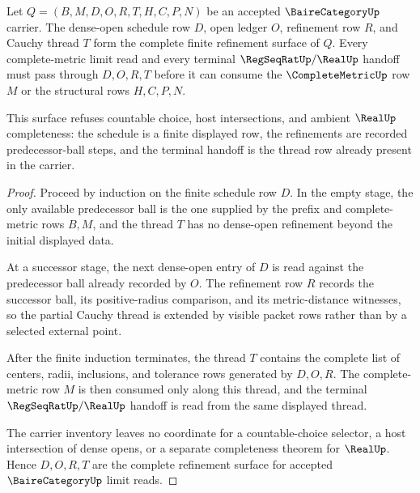 \begin{theorem}
\label{thm:bairecategory-refinement-schedule-obligation}
Let $Q=(B,M,D,O,R,T,H,C,P,N)$ be an accepted $\BaireCategoryUp$ carrier. The dense-open schedule row $D$, open ledger $O$, refinement row $R$, and Cauchy thread $T$ form the complete finite refinement surface of $Q$. Every complete-metric limit read and every terminal $\RegSeqRatUp/\RealUp$ handoff must pass through $D,O,R,T$ before it can consume the $\CompleteMetricUp$ row $M$ or the structural rows $H,C,P,N$.

This surface refuses countable choice, host intersections, and ambient $\RealUp$ completeness: the schedule is a finite displayed row, the refinements are recorded predecessor-ball steps, and the terminal handoff is the thread row already present in the carrier.
\end{theorem}
\begin{proof}
Proceed by induction on the finite schedule row $D$. In the empty stage, the only available predecessor ball is the one supplied by the prefix and complete-metric rows $B,M$, and the thread $T$ has no dense-open refinement beyond the initial displayed data.

At a successor stage, the next dense-open entry of $D$ is read against the predecessor ball already recorded by $O$. The refinement row $R$ records the successor ball, its positive-radius comparison, and its metric-distance witnesses, so the partial Cauchy thread is extended by visible packet rows rather than by a selected external point.

After the finite induction terminates, the thread $T$ contains the complete list of centers, radii, inclusions, and tolerance rows generated by $D,O,R$. The complete-metric row $M$ is then consumed only along this thread, and the terminal $\RegSeqRatUp/\RealUp$ handoff is read from the same displayed thread.

The carrier inventory leaves no coordinate for a countable-choice selector, a host intersection of dense opens, or a separate completeness theorem for $\RealUp$. Hence $D,O,R,T$ are the complete refinement surface for accepted $\BaireCategoryUp$ limit reads.
\end{proof}

